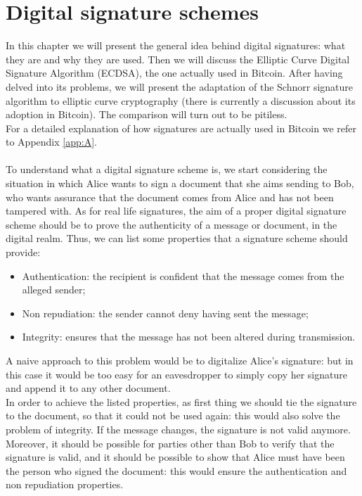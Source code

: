 \chapter{Digital signature schemes}
\label{chpr:dss}

In this chapter we will present the general idea behind digital signatures: what they are and why they are used. Then we will discuss the Elliptic Curve Digital Signature Algorithm (ECDSA), the one actually used in Bitcoin. After having delved into its problems, we will present the adaptation of the Schnorr signature algorithm to elliptic curve cryptography (there is currently a discussion about its adoption in Bitcoin). The comparison will turn out to be pitiless.
\\
For a detailed explanation of how signatures are actually used in Bitcoin we refer to Appendix \ref{app:A}.
\\
\\
To understand what a digital signature scheme is, we start considering the situation in which Alice wants to sign a document that she aims sending to Bob, who wants assurance that the document comes from Alice and has not been tampered with. As for real life signatures, the aim of a proper digital signature scheme should be to prove the authenticity of a message or document, in the digital realm. Thus, we can list some properties that a signature scheme should provide:
\begin{itemize}
	\item Authentication: the recipient is confident that the message comes from the alleged sender;
	\item Non repudiation: the sender cannot deny having sent the message;
	\item Integrity: ensures that the message has not been altered during transmission.
\end{itemize}
A naive approach to this problem would be to digitalize Alice's signature: but in this case it would be too easy for an eavesdropper to simply copy her signature and append it to any other document. 
\\
In order to achieve the listed properties, as first thing we should tie the signature to the document, so that it could not be used again: this would also solve the problem of integrity. If the message changes, the signature is not valid anymore.  Moreover, it should be possible for parties other than Bob to verify that the signature is valid, and it should be possible to show that Alice must have been the person who signed the document: this would ensure the authentication and non repudiation properties. 
